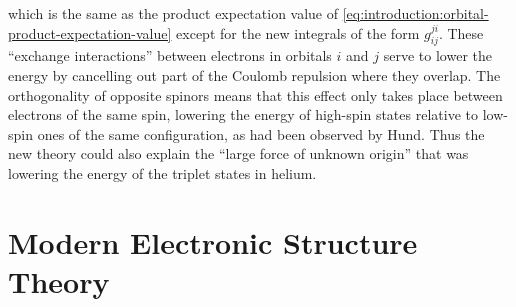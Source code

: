which is the same as the product expectation value of
\cref{eq:introduction:orbital-product-expectation-value} except for the new
integrals of the form
\(
    g_{ij}^{ji}
\).
These ``exchange interactions'' between electrons in orbitals \(i\) and \(j\)
serve to lower the energy by cancelling out part of the Coulomb repulsion where
they overlap.
The orthogonality of opposite spinors means that this effect only takes place
between electrons of the same spin, lowering the energy of high-spin states
relative to low-spin ones of the same configuration, as had been observed by
Hund.\cite{Hund:1925p345}
Thus the new theory could also explain the ``large force of unknown
origin''\cite{Mehra:1982} that was lowering the energy of the triplet states in
helium.


\section{Modern Electronic Structure Theory}

